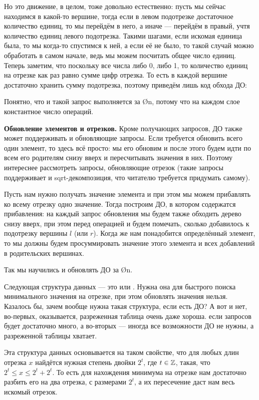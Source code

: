 {Но это движение, в целом, тоже довольно естественно: пусть мы сейчас находимся в какой-то вершине, тогда если в левом подотрезке достаточное количество единиц, то мы перейдём в него, а иначе — перейдём в правый, учтя количество единиц левого подотрезка. Такими шагами, если искомая единица была, то мы когда-то спустимся к ней, а если её не было, то такой случай можно обработать в самом начале, ведь мы можем посчитать общее число единиц.
Теперь заметим, что поскольку все числа либо 0, либо 1, то количество единиц на отрезке как раз равно сумме цифр отрезка. То есть в каждой вершине достаточно хранить сумму подотрезка, поэтому приведём лишь код обхода ДО:

\nocode

Понятно, что и такой запрос выполняется за \O{\log n}, потому что на каждом слое константное число операций.

\textbf{Обновление элементов и отрезков.} Кроме получающих запросов, ДО также может поддерживать и обновляющие запросы. Если требуется обновить всего один элемент, то здесь всё просто: мы его обновим и после этого будем идти по всем его родителям снизу вверх и пересчитывать значения в них. Поэтому интереснее рассмотреть запросы, обновляющие отрезок (такие запросы поддерживает и sqrt-декомпозиция, что читателю требуется придумать самому).

Пусть нам нужно получать значение элемента и при этом мы можем прибавлять ко всему отрезку одно значение. Тогда построим ДО, в котором содержатся прибавления: на каждый запрос обновления мы будем также обходить дерево снизу вверх, при этом перед операцией  и  будем помечать, сколько добавилось к подотрезку вершины $l$ (или $r$). Когда же нам понадобится определённый элемент, то мы должны будем просуммировать значение этого элемента и всех добавлений в родительских вершинах. 

Так мы научились и обновлять ДО за \O{\log n}.


Следующая структура данных — это  или . Нужна она для быстрого поиска минимального значения на отрезке, при этом обновлять значения нельзя. Казалось бы, зачем вообще нужна такая структура, если есть ДО? А вот и нет, во-первых, оказывается, разреженная таблица очень даже хороша. если запросов будет достаточно много, а во-вторых — иногда все возможности ДО не нужны, а разреженной таблицы хватает.

Эта структура данных основывается на таком свойстве, что для любых длин отрезка $x$ найдётся нужная степень двойки $2^t$, где $t \in \mathbb{Z}$, такая, что $2^t \leq x \leq 2^t + 2^t$. То есть для нахождения минимума на отрезке нам достаточно разбить его на два отрезка, с размерами $2^t$, а их пересечение даст нам весь искомый отрезок.

}
